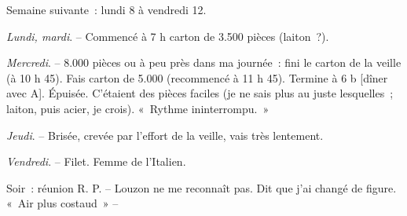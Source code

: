 \documentclass[french,twoside]{book} %
\begin{document}
Semaine suivante : lundi 8 à vendredi 12.\par
{\itshape Lundi, mardi}. – Commencé à 7 h carton de 3.500 pièces (laiton ?).\par
{\itshape Mercredi}. – 8.000 pièces ou à peu près dans ma journée : fini le carton de la veille (à 10 h 45). Fais carton de 5.000 (recommencé à 11 h 45). Termine à 6 b [dîner avec A]. Épuisée. C'étaient des pièces faciles (je ne sais plus au juste lesquelles ; laiton, puis acier, je crois). « Rythme ininterrompu. »\par
{\itshape Jeudi}. – Brisée, crevée par l'effort de la veille, vais très lentement.\par
{\itshape Vendredi}. – Filet. Femme de l'Italien.\par
Soir : réunion R. P. – Louzon ne me reconnaît pas. Dit que j'ai changé de figure. « Air plus costaud » –\par
\end{document}
